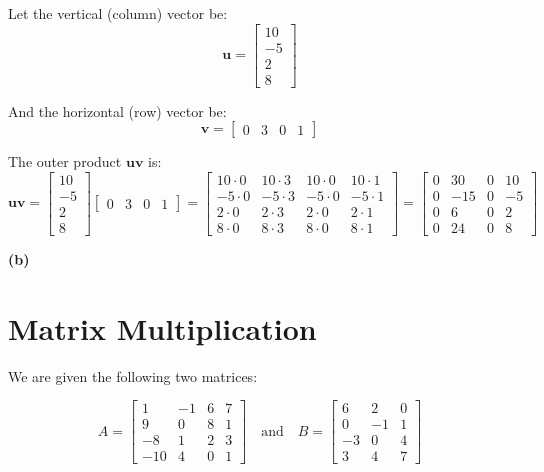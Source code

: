 \documentclass{article}
\begin{document}
Let the vertical (column) vector be:
\[
\mathbf{u} = \begin{bmatrix}
10 \\
-5 \\
2 \\
8
\end{bmatrix}
\]

And the horizontal (row) vector be:
\[
\mathbf{v} = \begin{bmatrix}
0 & 3 & 0 & 1
\end{bmatrix}
\]

The outer product \(\mathbf{u} \mathbf{v}\) is:
\[
\mathbf{u} \mathbf{v} =
\begin{bmatrix}
10 \\
-5 \\
2 \\
8
\end{bmatrix}
\begin{bmatrix}
0 & 3 & 0 & 1
\end{bmatrix}
=
\begin{bmatrix}
10 \cdot 0 & 10 \cdot 3 & 10 \cdot 0 & 10 \cdot 1 \\
-5 \cdot 0 & -5 \cdot 3 & -5 \cdot 0 & -5 \cdot 1 \\
2 \cdot 0 & 2 \cdot 3 & 2 \cdot 0 & 2 \cdot 1 \\
8 \cdot 0 & 8 \cdot 3 & 8 \cdot 0 & 8 \cdot 1
\end{bmatrix}
=
\begin{bmatrix}
0 & 30 & 0 & 10 \\
0 & -15 & 0 & -5 \\
0 & 6 & 0 & 2 \\
0 & 24 & 0 & 8
\end{bmatrix}
\]

\vspace{1cm}

\textbf{(b)}

\section*{Matrix Multiplication}

We are given the following two matrices:

\[
A = \begin{bmatrix}
1 & -1 & 6 & 7 \\
9 & 0 & 8 & 1 \\
-8 & 1 & 2 & 3 \\
-10 & 4 & 0 & 1
\end{bmatrix}
\quad \text{and} \quad
B = \begin{bmatrix}
6 & 2 & 0 \\
0 & -1 & 1 \\
-3 & 0 & 4 \\
3 & 4 & 7
\end{bmatrix}
\]
\end{document}

